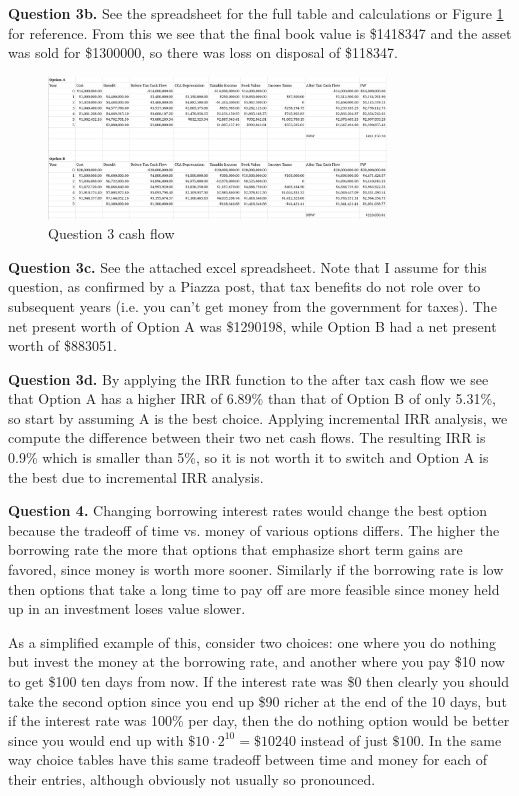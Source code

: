 \documentclass[letterpaper, reqno,11pt]{article}
\begin{document}
\medskip

{\noindent\bf Question 3b.} See the spreadsheet for the full table and calculations or Figure \ref{fig:q3} for reference. From this we see that the final book value is \$1418347 and the asset was sold for \$1300000, so there was loss on disposal of \$118347.

\begin{figure}[htpb]
    \centering
    \includegraphics[width=0.8\textwidth]{q3}
    \caption{Question 3 cash flow}
    \label{fig:q3}
\end{figure}

\medskip

{\noindent\bf Question 3c.} See the attached excel spreadsheet. Note that I assume for this question, as confirmed by a Piazza post, that tax benefits do not role over to subsequent years (i.e. you can't get money from the government for taxes). The net present worth of Option A was \$1290198, while Option B had a net present worth of \$883051. 

{\noindent\bf Question 3d.} By applying the IRR function to the after tax cash flow we see that Option A has a higher IRR of 6.89\% than that of Option B of only 5.31\%, so start by assuming A is the best choice. Applying incremental IRR analysis, we compute the difference between their two net cash flows. The resulting IRR is 0.9\% which is smaller than 5\%, so it is not worth it to switch and Option A is the best due to incremental IRR analysis. 

\medskip

{\noindent\bf Question 4.} Changing borrowing interest rates would change the best option because the tradeoff of time vs. money of various options differs. The higher the borrowing rate the more that options that emphasize short term gains are favored, since money is worth more sooner. Similarly if the borrowing rate is low then options that take a long time to pay off are more feasible since money held up in an investment loses value slower. 

As a simplified example of this, consider two choices: one where you do nothing but invest the money at the borrowing rate, and another where you pay \$10 now to get \$100 ten days from now. If the interest rate was \$0 then clearly you should take the second option since you end up \$90 richer at the end of the 10 days, but if the interest rate was 100\% per day, then the do nothing option would be better since you would end up with $\$10\cdot 2^{10}=\$10240$ instead of just $\$100$. In the same way choice tables have this same tradeoff between time and money for each of their entries, although obviously not usually so pronounced. 
\end{document}
